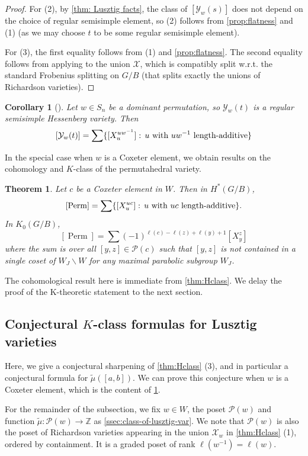 \documentclass[11pt]{amsart}
\newtheorem{theorem}[Thm]{Theorem}
\newtheorem{corollary}[Thm]{Corollary}
\theoremstyle{definition}
\DeclareMathOperator{\Perm}{Perm}
\newcommand{\ZZ}{\mathbb{Z}}
\def\calP{\mathcal{P}}
\def\calX{\mathcal{X}}
\def\mob{\tilde{\mu}}
\newcommand\calY{{\mathcal Y}}
\renewcommand{\colon}{\mathrel{:}}
\renewcommand{\colon}{:\mkern\thinmuskip}
\begin{document}
\begin{proof}
  For (2), by \cref{thm: Lusztig facts}, the class of $[\calY_w(s)]$ does not
  depend on the choice of regular semisimple element, so (2) follows from \cref{prop:flatness} and (1) (as we may choose $t$ to be some
  regular semisimple element).
  
  For (3), the first equality follows from (1) and \cref{prop:flatness}.
  The second equality follows from applying \cite[Theorem 1]{K09} to
  the union $\calX$, which is compatibly split w.r.t. the standard Frobenius
  splitting on $G/B$ (that splits exactly the unions of Richardson varieties).
\end{proof}



\begin{corollary}[{\cite[Equation (14)]{AT10}}]
 Let $w\in S_n$ be a dominant permutation,
    so $\calY_w(t)$ is a regular semisimple Hessenberg variety.
    Then
    \[ [\calY_w(t)] =
      \sum \{ [X_{u}^{uw^{-1}}] \colon u\text{ with }uw^{-1}\text{ length-additive} \} \]
\end{corollary}

In the special case when $w$ is a Coxeter element, we obtain results on the cohomology and $K$-class of the permutahedral variety. 

\begin{theorem}\label{thm:k-cohom-formulas-for-perm}
	    Let $c$ be a Coxeter element in $W$. Then in $H^*(G/B)$, 
	\[ [\Perm] = \sum \{ [X_{u}^{uc}] \colon u\text{ with }uc\text{ length-additive} \}. \]
	In $K_0(G/B)$, 
	\[[\Perm] = \sum (-1)^{\ell(c)-\ell(z) + \ell(y)+1} [X_y^z]\]
	where the sum is over all $[y,z] \in \calP(c)$ such that $[y,z]$ is not contained in a single coset of $W_J \backslash W$ for any maximal parabolic subgroup $W_J$.
\end{theorem}
The cohomological result here is immediate from \cref{thm:Hclass}. We delay the proof of the K-theoretic statement to the next section.

\subsection{Conjectural $K$-class formulas for Lusztig varieties}
Here, we give a conjectural sharpening of \cref{thm:Hclass} (3), and in particular a conjectural formula for $\mob([a,b])$. We can prove this conjecture when $w$ is a Coxeter element, which is the content of \cref{thm:k-cohom-formulas-for-perm}.




 For the remainder of the subsection, we fix $w \in W$, the poset $\calP(w)$ and function $\mob: \calP(w) \to \ZZ$ as \cref{ssec:class-of-lusztig-var}. We note that $\calP(w)$ is also the poset of Richardson varieties appearing in the union $\calX_w$ in \cref{thm:Hclass} (1), ordered by containment. It is a graded poset of rank $\ell(w^{-1})= \ell(w)$.
 
\end{document}

